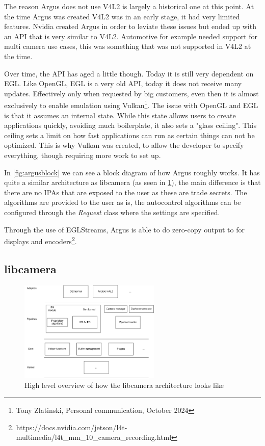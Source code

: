 The reason Argus does not use V4L2 is largely a historical one at this point.
At the time Argus was created V4L2 was in an early stage, it had very limited
features. Nvidia created Argus in order to leviate these issues but ended up
with an API that is very similar to V4L2. Automotive for example needed support
for multi camera use cases, this was something that was not supported in V4L2 at
the time.

Over time, the API has aged a little though. Today it is still very dependent
on EGL. Like OpenGL, EGL is a very old API, today it does not receive many
updates. Effectively only when requested by big customers, even then it is
almost exclusively to enable emulation using Vulkan\footnote{Tony Zlatinski,
Personal communication, October 2024}. The issue with OpenGL and EGL is that it
assumes an internal state. While this state allows users to create applications
quickly, avoiding much boilerplate, it also sets a "glass ceiling". This
ceiling sets a limit on how fast applications can run as certain things can not
be optimized. This is why Vulkan was created, to allow the developer to specify
everything, though requiring more work to set up.

In \cref{fig:argusblock} we can see a block diagram of how Argus roughly works.
It has quite a similar architecture as libcamera (as seen in
\cref{fig:libcameraarch}), the main difference is that there are no IPAs that
are exposed to the user as these are trade secrets. The algorithms are provided
to the user as is, the autocontrol algorithms can be configured through the
\textit{Request} class where the settings are specified.

Through the use of EGLStreams, Argus is able to do zero-copy output to for
displays and encoders\footnote{https://docs.nvidia.com/jetson/l4t-multimedia/l4t\_mm\_10\_camera\_recording.html}.


\subsection{libcamera}
\begin{figure}
    \begin{center}
        \includegraphics[width=0.60\textwidth]{figures/libcameraarch.png}
    \end{center}
    \caption{High level overview of how the libcamera architecture looks like}
    \label{fig:libcameraarch}
\end{figure}

